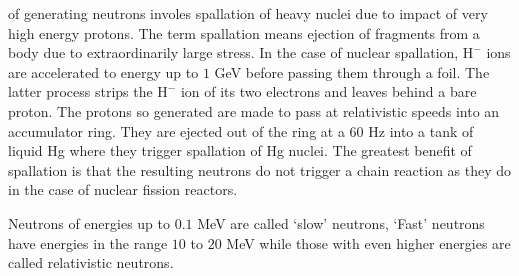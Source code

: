 \documentclass{article}
\numberwithin{equation}{section}
\begin{document}
of generating neutrons involes spallation of heavy nuclei due to impact of 
very high energy protons. The term spallation means ejection of fragments from
a body due to extraordinarily large stress. In the case of nuclear spallation,
$\text{H}^{-}$ ions are accelerated to energy up to $1$ GeV before passing
them through a foil. The latter process strips the $\text{H}^{-}$ ion of its
two electrons and leaves behind a bare proton. The protons so generated are
made to pass at relativistic speeds into an accumulator ring. They are 
ejected out of the ring at a $60$ Hz into a tank of liquid Hg where they
trigger spallation of Hg nuclei. The greatest benefit of spallation is that
the resulting neutrons do not trigger a chain reaction as they do in the case
of nuclear fission reactors.

Neutrons of energies up to $0.1$ MeV are called `slow' neutrons, `Fast'
neutrons have energies in the range $10$ to $20$ MeV while those with even
higher energies are called relativistic neutrons.
\end{document}
